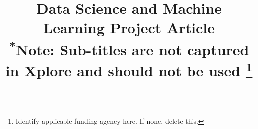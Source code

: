 \documentclass[conference]{IEEEtran}
\begin{document}
\title{Data Science and Machine Learning Project Article\\
{\footnotesize \textsuperscript{*}Note: Sub-titles are not captured in Xplore and
should not be used}
\thanks{Identify applicable funding agency here. If none, delete this.}
}

\author{
}




\maketitle
\end{document}
